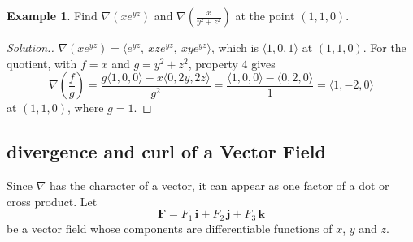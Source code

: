 \documentclass[11pt,a4paper]{article}
\theoremstyle{definition}
\newtheorem{exa}[thm]{Example}
\newenvironment{solution}
  {\renewcommand{\qedsymbol}{}\begin{proof}[\textit{Solution}.]}
  {\end{proof}}
\begin{document}
\begin{exa}
\label{ex:gradproduct}
Find $\nabla\left(xe^{yz}\right)$ and $\nabla\left(\frac{x}{y^2 + z^2}\right)$ at
the point $(1,1,0)$.
\end{exa}

\begin{solution}
$\nabla(xe^{yz}) = \langle e^{yz},\ xze^{yz},\ xye^{yz}\rangle$, which is
$\langle 1, 0, 1\rangle$ at $(1,1,0)$. For the quotient, with $f = x$ and
$g = y^2 + z^2$, property 4 gives
\[\nabla\left(\frac fg\right) = \frac{g\langle 1,0,0\rangle - x\langle 0, 2y,
2z\rangle}{g^2} = \frac{\langle 1, 0, 0\rangle - \langle 0,2,0\rangle}{1} =
\langle 1,-2,0\rangle\]
at $(1,1,0)$, where $g = 1$.
\end{solution}

{\color[wave]{485}\subsection{divergence and curl of a Vector Field}}

Since $\nabla$ has the character of a vector, it can appear as one factor of a
dot or cross product. Let
\[\mathbf F = F_1\, \mathbf i + F_2\, \mathbf j + F_3\,\mathbf k\]
be a vector field whose components are differentiable functions of $x$, $y$ and
$z$.
\end{document}
